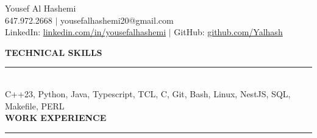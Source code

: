 \documentclass[12pt]{article}
\newcommand{\sectionRule}{\textcolor{gray}{\rule{7.27in}{0.02cm}}}
\newcommand{\sectionTxt}[1]{\noindent\textbf{#1}\\}
\begin{document}
    \begin{center}
        {\huge Yousef Al Hashemi}\vspace{0.5em}\\
        {\normalsize 647.972.2668 $|$ yousefalhashemi20@gmail.com}\\
        {\normalsize LinkedIn: \href{https://www.linkedin.com/in/yousefalhashemi}{linkedin.com/in/yousefalhashemi} $|$ GitHub: \href{https://github.com/Yalhash}{github.com/Yalhash}}\\
    \end{center}

    \sectionTxt{TECHNICAL SKILLS}
    \sectionRule \\


    {C++23, Python, Java, Typescript, TCL, C, Git, Bash, Linux, NestJS, SQL, Makefile, PERL} \\


    \sectionTxt{WORK EXPERIENCE}
    \sectionRule
\end{document}
